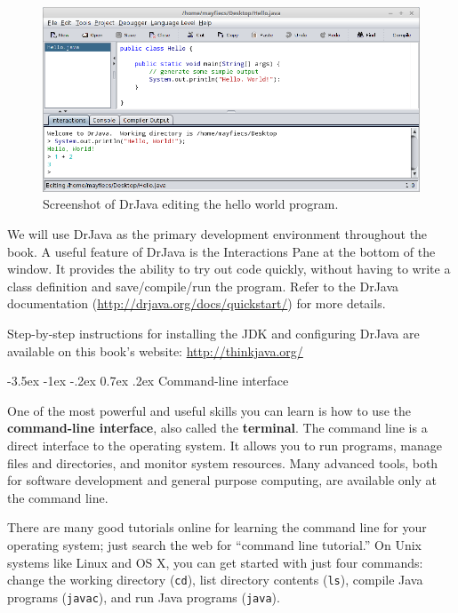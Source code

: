 \documentclass[12pt]{book}
\makeatletter
\theoremstyle{exercise}
\renewcommand{\section}{\@startsection{section}{1}{\z@}%
    {-3.5ex \@plus -1ex \@minus -.2ex}%
    {0.7ex \@plus.2ex}%
    {\normalfont\Large\bfseries}}
\makeatother
\begin{document}
\begin{figure}[!h]
\begin{center}
\includegraphics[width=\textwidth]{figs/drjava-hello.png}
\caption{Screenshot of DrJava editing the hello world program.}
\end{center}
\end{figure}


We will use DrJava as the primary development environment throughout the book.
A useful feature of DrJava is the Interactions Pane at the bottom of the window.
It provides the ability to try out code quickly, without having to write a class definition and save/compile/run the program.
Refer to the DrJava documentation (\url{http://drjava.org/docs/quickstart/}) for more details.

Step-by-step instructions for installing the JDK and configuring DrJava are available on this book's website: \url{http://thinkjava.org/}


\section{Command-line interface}
\label{commandline}

One of the most powerful and useful skills you can learn is how to use the {\bf command-line interface}, also called the {\bf terminal}.
The command line is a direct interface to the operating system.
It allows you to run programs, manage files and directories, and monitor system resources.
Many advanced tools, both for software development and general purpose computing, are available only at the command line.

There are many good tutorials online for learning the command line for your operating system; just search the web for ``command line tutorial.''
On Unix systems like Linux and OS X, you can get started with just four commands: change the working directory ({\tt cd}), list directory contents ({\tt ls}), compile Java programs ({\tt javac}), and run Java programs ({\tt java}).
\end{document}
